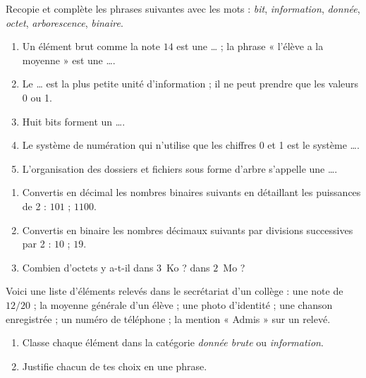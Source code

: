 \documentclass[11pt]{article}
\newcounter{popsec}
\newcounter{popsub}
\newcommand{\courssub}[1]{%
  \stepcounter{popsub}%
  \par\vspace{9pt}\noindent{\popxbold\fontsize{11.5}{13}\selectfont\color{popink}{\color{poporange}\thepopsec.\thepopsub}\hspace{6pt}#1}\par\nopagebreak\vspace{4pt}
}
\begin{document}
\begin{exercice}
Recopie et complète les phrases suivantes avec les mots : \emph{bit}, \emph{information}, \emph{donnée}, \emph{octet}, \emph{arborescence}, \emph{binaire}.
\begin{enumerate}
\item Un élément brut comme la note $14$ est une \ldots{} ; la phrase « l'élève a la moyenne » est une \ldots{}.
\item Le \ldots{} est la plus petite unité d'information ; il ne peut prendre que les valeurs 0 ou 1.
\item Huit bits forment un \ldots{}.
\item Le système de numération qui n'utilise que les chiffres 0 et 1 est le système \ldots{}.
\item L'organisation des dossiers et fichiers sous forme d'arbre s'appelle une \ldots{}.
\end{enumerate}
\end{exercice}

\begin{exercice}
\begin{enumerate}
\item Convertis en décimal les nombres binaires suivants en détaillant les puissances de 2 : $101$ ; $1100$.
\item Convertis en binaire les nombres décimaux suivants par divisions successives par 2 : $10$ ; $19$.
\item Combien d'octets y a-t-il dans $3$~Ko ? dans $2$~Mo ?
\end{enumerate}
\end{exercice}

\courssub{Je m'entraîne}

\begin{exercice}
Voici une liste d'éléments relevés dans le secrétariat d'un collège : une note de $12/20$ ; la moyenne générale d'un élève ; une photo d'identité ; une chanson enregistrée ; un numéro de téléphone ; la mention « Admis » sur un relevé.
\begin{enumerate}
\item Classe chaque élément dans la catégorie \emph{donnée brute} ou \emph{information}.
\item Justifie chacun de tes choix en une phrase.
\end{enumerate}
\end{exercice}
\end{document}
